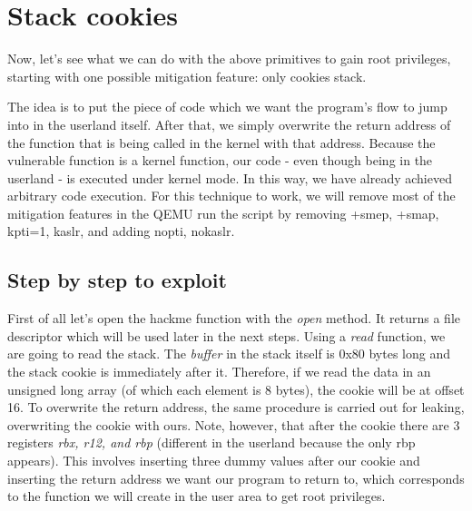 \documentclass{masterthesis}
\begin{document}
\section{Stack cookies}
Now, let's see what we can do with the above primitives to gain root privileges, starting with one possible mitigation feature: only cookies stack.

The idea is to put the piece of code which we want the program’s flow to jump into in the userland itself. After that, we simply overwrite the return address of the function that is being called in the kernel with that address. Because the vulnerable function is a kernel function, our code - even though being in the userland - is executed under kernel mode. In this way, we have already achieved arbitrary code execution.
For this technique to work, we will remove most of the mitigation features in the QEMU run the script by removing +smep, +smap, kpti=1, kaslr, and adding nopti, nokaslr.
\subsection{Step by step to exploit}
First of all let's open the hackme function with the \emph{open} method. It returns a file descriptor which will be used later in the next steps.
Using a \emph{read} function, we are going to read the stack.
The \emph{buffer} in the stack itself is 0x80 bytes long and the stack cookie is immediately after it. Therefore, if we read the data in an unsigned long array (of which each element is 8 bytes), the cookie will be at offset 16.
To overwrite the return address, the same procedure is carried out for leaking, overwriting the cookie with ours. Note, however, that after the cookie there are 3 registers \emph{rbx, r12, and rbp} (different in the userland because the only rbp appears).
This involves inserting three dummy values after our cookie and inserting the return address we want our program to return to, which corresponds to the function we will create in the user area to get root privileges.
\end{document}
